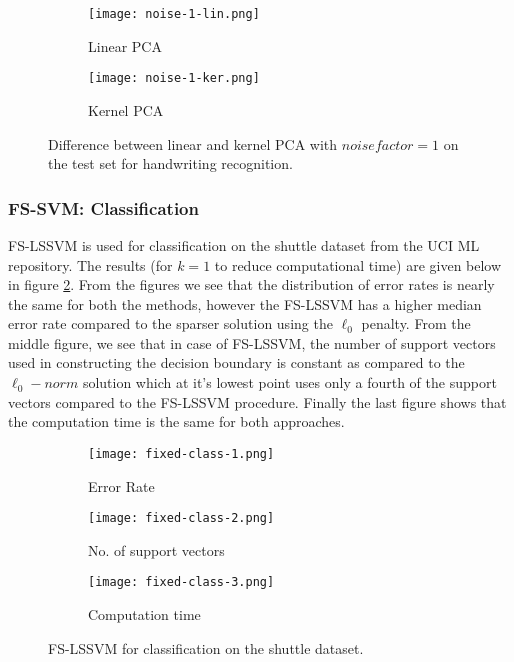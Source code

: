 \documentclass[paper=a4, fontsize=11pt]{scrartcl} %
\numberwithin{equation}{section} %
\begin{document}
\begin{figure}[ht]
\centering
	\begin{subfigure}[b]{0.5\textwidth}
		\centering
		\texttt{[image: noise-1-lin.png]}
		\caption{Linear PCA}
	\end{subfigure}%
	\begin{subfigure}[b]{0.5\textwidth}
		\centering
		\texttt{[image: noise-1-ker.png]}
		\caption{Kernel PCA}
	\end{subfigure}
\caption{Difference between linear and kernel PCA with $noisefactor=1$ on the test set for handwriting recognition.}
\label{noisefactor-1}
\end{figure}


\subsubsection{FS-SVM: Classification}

FS-LSSVM is used for classification on the shuttle dataset from the UCI ML repository. The results (for $k=1$ to reduce computational time) are given below in figure \ref{fixed-class}. From the figures we see that the distribution of error rates is nearly the same for both the methods, however the FS-LSSVM has a higher median error rate compared to the sparser solution using the $\ell_0$ penalty. From the middle figure, we see that in case of FS-LSSVM, the number of support vectors used in constructing the decision boundary is constant as compared to the $\ell_0-norm$ solution which at it's lowest point uses only a fourth of the support vectors compared to the FS-LSSVM procedure. Finally the last figure shows that the computation time is the same for both approaches.

\begin{figure}[ht]
\centering
	\begin{subfigure}[b]{0.3\textwidth}
		\centering
		\texttt{[image: fixed-class-1.png]}
		\caption{Error Rate}
	\end{subfigure}%
	\begin{subfigure}[b]{0.3\textwidth}
		\centering
		\texttt{[image: fixed-class-2.png]}
		\caption{No. of support vectors}
	\end{subfigure}%
	\begin{subfigure}[b]{0.3\textwidth}
		\centering
		\texttt{[image: fixed-class-3.png]}
		\caption{Computation time}
	\end{subfigure}
\caption{FS-LSSVM for classification on the shuttle dataset.}
\label{fixed-class}
\end{figure}
\end{document}
